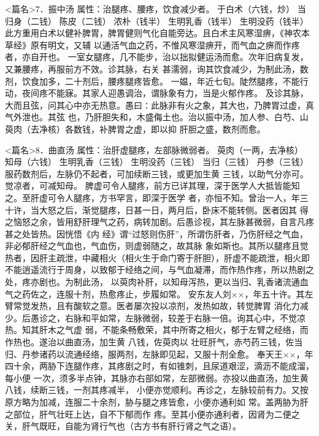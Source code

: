 \documentclass[a4paper,12pt,UTF8,twoside]{ctexbook}
\begin{document}
<篇名>7．振中汤
属性：治腿疼、腰疼，饮食减少者。 
于白术（六钱，炒） 当归身（二钱） 陈皮（二钱） 浓朴（钱半） 生明乳香（钱半） 生明没药（钱半） 
此方重用白术以健补脾胃，脾胃健则气化自能旁达。且白术主风寒湿痹，《神农本草经》原有明文，又辅 
以通活气血之药，不惟风寒湿痹开，而气血之痹而作疼者，亦自开也。 
一室女腿疼，几不能步，治以拙拟健运汤而愈。次年旧病复发，又兼腰疼，再服前方不效。诊其脉，右关 
甚濡弱，询其饮食减少，为制此汤，数剂，饮食加多，二十剂后，腰疼腿疼皆愈。 
一媪，年近七旬。陡然腿疼，不能行动，夜间疼不能寐。其家人迎愚调治，谓脉象有力，当是火郁作疼。 
及诊其脉，大而且弦，问其心中亦无热意。愚曰∶此脉非有火之象，其大也，乃脾胃过虚，真气外泄也。其弦 
也，乃肝胆失和，木盛侮土也。治以振中汤，加人参、白芍、山萸肉（去净核）各数钱，补脾胃之虚，即以抑 
肝胆之盛，数剂而愈。 


<篇名>8．曲直汤
属性：治肝虚腿疼，左部脉微弱者。 
萸肉（一两，去净核） 知母（六钱） 生明乳香（三钱） 生明没药（三钱） 当归（三钱） 丹参（三钱） 
服药数剂后，左脉仍不起者，可加续断三钱，或更加生黄 三钱，以助气分亦可。觉凉者，可减知母。 
脾虚可令人腿疼，前方已详其理，深于医学人大抵皆能知之。至肝虚可令人腿疼，方书罕言，即深于医学 
者，亦恒不知。曾治一人，年三十许，当大怒之后，渐觉腿疼，日甚一日，两月后，卧床不能转侧。医者因其 
得之恼怒之余，皆用舒肝理气之药，病转加剧。后愚诊视，其左脉甚微弱，自言凡疼甚之处皆热。因恍悟《内 
经》谓“过怒则伤肝”，所谓伤肝者，乃伤肝经之气血，非必郁肝经之气血也，气血伤，则虚弱随之，故其脉 
象如斯也。其所以腿疼且觉热者，因肝主疏泄，中藏相火（相火生于命门寄于肝胆），肝虚不能疏泄，相火即 
不能逍遥流行于周身，以致郁于经络之间，与气血凝滞，而作热作疼，所以热剧之处，疼亦剧也。为制此汤， 
以萸肉补肝，以知母泻热，更以当归、乳香诸流通血气之药佐之，连服十剂，热愈疼止，步履如常。 
安东友人刘××，年五十许。其左臂常觉发热，且有酸软之意。医者屡次投以凉剂，发热如故，转觉脾胃 
消化力减少。后愚诊之，右脉和平如常，左脉微弱，较差于右脉一倍。询其心中，不觉凉热。知其肝木之气虚 
弱，不能条畅敷荣，其中所寄之相火，郁于左臂之经络，而作热也。遂治以曲直汤，加生黄 八钱，佐萸肉以 
壮旺肝气，赤芍药三钱，佐当归、丹参诸药以流通经络，服两剂，左脉即见起，又服十剂全愈。 
奉天王××，年四十余，两胁下连腿作疼，其疼剧之时，有如锥刺，且尿道艰涩，滴沥不能成溜，每小便 
一次，须多半点钟，其脉亦右部如常，左部微弱。亦投以曲直汤，加生黄 八钱，续断三钱，一剂其疼减半， 
小便亦觉顺利。再诊之，左脉较前有力。又按原方略为加减，连服二十余剂，胁与腿之疼皆愈，小便亦通利如 
常。盖两胁为肝之部位，肝气壮旺上达，自不下郁而作 
疼。至其小便亦通利者，因肾为二便之关，肝气既旺，自能为肾行气也（古方书有肝行肾之气之语）。 
\end{document}
